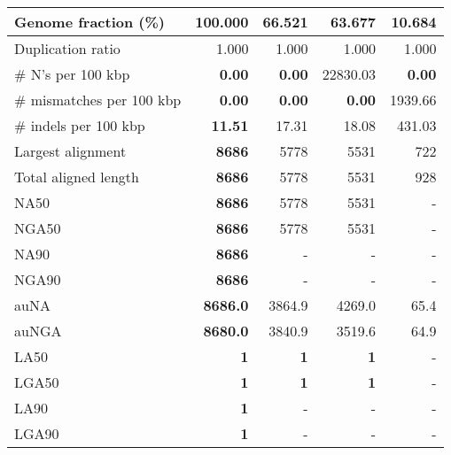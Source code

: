 \documentclass[12pt,a4paper]{article}
\begin{document}
\begin{table}[ht]
\begin{center}
\begin{tabular}{|l*{4}{|r}|}
Genome fraction (\%) & {\bf 100.000} & 66.521 & 63.677 & 10.684 \\ \hline
Duplication ratio & 1.000 & 1.000 & 1.000 & 1.000 \\ \hline
\# N's per 100 kbp & {\bf 0.00} & {\bf 0.00} & 22830.03 & {\bf 0.00} \\ \hline
\# mismatches per 100 kbp & {\bf 0.00} & {\bf 0.00} & {\bf 0.00} & 1939.66 \\ \hline
\# indels per 100 kbp & {\bf 11.51} & 17.31 & 18.08 & 431.03 \\ \hline
Largest alignment & {\bf 8686} & 5778 & 5531 & 722 \\ \hline
Total aligned length & {\bf 8686} & 5778 & 5531 & 928 \\ \hline
NA50 & {\bf 8686} & 5778 & 5531 & - \\ \hline
NGA50 & {\bf 8686} & 5778 & 5531 & - \\ \hline
NA90 & {\bf 8686} & - & - & - \\ \hline
NGA90 & {\bf 8686} & - & - & - \\ \hline
auNA & {\bf 8686.0} & 3864.9 & 4269.0 & 65.4 \\ \hline
auNGA & {\bf 8680.0} & 3840.9 & 3519.6 & 64.9 \\ \hline
LA50 & {\bf 1} & {\bf 1} & {\bf 1} & - \\ \hline
LGA50 & {\bf 1} & {\bf 1} & {\bf 1} & - \\ \hline
LA90 & {\bf 1} & - & - & - \\ \hline
LGA90 & {\bf 1} & - & - & - \\ \hline
\end{tabular}
\end{center}
\end{table}
\end{document}

